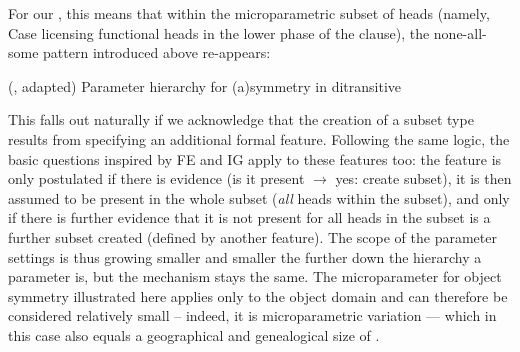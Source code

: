 \documentclass[output=paper]{langsci/langscibook}
\begin{document}
For our , this means that within the
microparametric subset of heads (namely, Case
licensing
functional heads in the lower phase of the clause), the none-all-some pattern
introduced above re-appears:

\ea {} (\citeyear{vanderWal2017}, adapted)
    \sn Parameter hierarchy for (a)symmetry in
    ditransitive 
\z
{}

This falls out naturally if we acknowledge that the creation of a subset type
results from specifying an additional formal feature. Following the same logic,
the basic questions inspired by \gls{FE} and \gls{IG} apply to these features too: the
feature is only postulated if there is evidence (is it present $\to$ yes:
create subset), it is then assumed to be present in the whole subset
(\emph{all} heads within the subset), and only if there is further evidence
that it is not present for all heads in the subset is a further subset created
(defined by another feature). The scope of the parameter settings is thus
growing smaller and smaller the further down the hierarchy a parameter is, but
the mechanism stays the same. The microparameter for object symmetry
illustrated here applies only to the object domain and can therefore be
considered relatively small -- indeed, it is microparametric variation ---
which in this case also equals a geographical and genealogical size of
.
\end{document}
